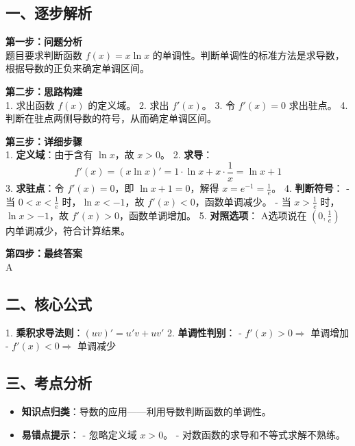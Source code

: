 \documentclass[12pt, a4paper]{ctexart}
\newenvironment{RedAnalysis}{
    \par
    \color{red} %
}{
    \par
    \color{black} %
}
\begin{document}
\begin{RedAnalysis}

\subsection*{一、逐步解析}

\textbf{第一步：问题分析} \\
题目要求判断函数 $f(x) = x \ln x$ 的单调性。判断单调性的标准方法是求导数，根据导数的正负来确定单调区间。

\textbf{第二步：思路构建} \\
1. 求出函数 $f(x)$ 的定义域。
2. 求出 $f'(x)$。
3. 令 $f'(x) = 0$ 求出驻点。
4. 判断在驻点两侧导数的符号，从而确定单调区间。

\textbf{第三步：详细步骤} \\
1. \textbf{定义域}：由于含有 $\ln x$，故 $x > 0$。
2. \textbf{求导}：
   \[ f'(x) = (x \ln x)' = 1 \cdot \ln x + x \cdot \frac{1}{x} = \ln x + 1 \]
3. \textbf{求驻点}：令 $f'(x) = 0$，即 $\ln x + 1 = 0$，解得 $x = e^{-1} = \frac{1}{e}$。
4. \textbf{判断符号}：
   - 当 $0 < x < \frac{1}{e}$ 时，$\ln x < -1$，故 $f'(x) < 0$，函数单调减少。
   - 当 $x > \frac{1}{e}$ 时，$\ln x > -1$，故 $f'(x) > 0$，函数单调增加。
5. \textbf{对照选项}：
   A选项说在 $(0, \frac{1}{e})$ 内单调减少，符合计算结果。

\textbf{第四步：最终答案} \\
A

\subsection*{二、核心公式}
1. \textbf{乘积求导法则}：$(uv)' = u'v + uv'$
2. \textbf{单调性判别}：
   - $f'(x) > 0 \Rightarrow$ 单调增加
   - $f'(x) < 0 \Rightarrow$ 单调减少

\subsection*{三、考点分析}
\begin{itemize}
    \item \textbf{知识点归类}：导数的应用——利用导数判断函数的单调性。
    \item \textbf{易错点提示}：
       - 忽略定义域 $x>0$。
       - 对数函数的求导和不等式求解不熟练。
\end{itemize}

\end{RedAnalysis}

\vspace{2em}
\end{document}
